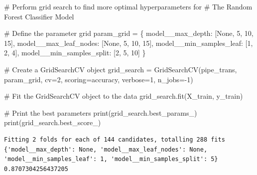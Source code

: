 \documentclass[
  letterpaper,
  DIV=11,
  numbers=noendperiod,
  oneside]{scrartcl}
\newenvironment{Shaded}{\begin{snugshade}}{\end{snugshade}}
\newcommand{\BuiltInTok}[1]{\textcolor[rgb]{0.00,0.23,0.31}{#1}}
\newcommand{\CommentTok}[1]{\textcolor[rgb]{0.37,0.37,0.37}{#1}}
\newcommand{\DecValTok}[1]{\textcolor[rgb]{0.68,0.00,0.00}{#1}}
\newcommand{\NormalTok}[1]{\textcolor[rgb]{0.00,0.23,0.31}{#1}}
\newcommand{\OperatorTok}[1]{\textcolor[rgb]{0.37,0.37,0.37}{#1}}
\newcommand{\StringTok}[1]{\textcolor[rgb]{0.13,0.47,0.30}{#1}}
\newcommand{\VariableTok}[1]{\textcolor[rgb]{0.07,0.07,0.07}{#1}}
\begin{document}
\hypertarget{lst-gridsearch}{}
\begin{Shaded}
\begin{Highlighting}[]
\CommentTok{\# Perform grid search to find more optimal hyperparameters for }
\CommentTok{\# The Random Forest Classifier Model}

\CommentTok{\# Define the parameter grid}
\NormalTok{param\_grid }\OperatorTok{=}\NormalTok{ \{}
    \StringTok{\textquotesingle{}model\_\_max\_depth\textquotesingle{}}\NormalTok{: [}\VariableTok{None}\NormalTok{, }\DecValTok{5}\NormalTok{, }\DecValTok{10}\NormalTok{, }\DecValTok{15}\NormalTok{],}
    \StringTok{\textquotesingle{}model\_\_max\_leaf\_nodes\textquotesingle{}}\NormalTok{: [}\VariableTok{None}\NormalTok{, }\DecValTok{5}\NormalTok{, }\DecValTok{10}\NormalTok{, }\DecValTok{15}\NormalTok{],}
    \StringTok{\textquotesingle{}model\_\_min\_samples\_leaf\textquotesingle{}}\NormalTok{: [}\DecValTok{1}\NormalTok{, }\DecValTok{2}\NormalTok{, }\DecValTok{4}\NormalTok{],}
    \StringTok{\textquotesingle{}model\_\_min\_samples\_split\textquotesingle{}}\NormalTok{: [}\DecValTok{2}\NormalTok{, }\DecValTok{5}\NormalTok{, }\DecValTok{10}\NormalTok{]}
\NormalTok{\}}

\CommentTok{\# Create a GridSearchCV object}
\NormalTok{grid\_search }\OperatorTok{=}\NormalTok{ GridSearchCV(pipe\_trans, param\_grid, cv}\OperatorTok{=}\DecValTok{2}\NormalTok{, scoring}\OperatorTok{=}\StringTok{\textquotesingle{}accuracy\textquotesingle{}}\NormalTok{, verbose}\OperatorTok{=}\DecValTok{1}\NormalTok{, n\_jobs}\OperatorTok{={-}}\DecValTok{1}\NormalTok{)}

\CommentTok{\# Fit the GridSearchCV object to the data}
\NormalTok{grid\_search.fit(X\_train, y\_train)}

\CommentTok{\# Print the best parameters}
\BuiltInTok{print}\NormalTok{(grid\_search.best\_params\_)}
\BuiltInTok{print}\NormalTok{(grid\_search.best\_score\_)}
\end{Highlighting}
\end{Shaded}

\begin{verbatim}
Fitting 2 folds for each of 144 candidates, totalling 288 fits
{'model__max_depth': None, 'model__max_leaf_nodes': None, 'model__min_samples_leaf': 1, 'model__min_samples_split': 5}
0.8707304256437205
\end{verbatim}

\hfill\break
\end{document}
